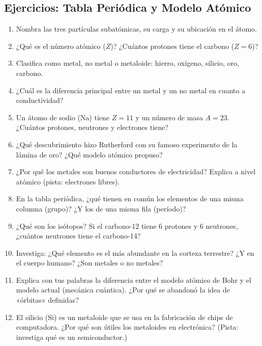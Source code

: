 \documentclass[12pt, letterpaper]{article}
\begin{document}
\newpage

\subsection{Ejercicios: Tabla Periódica y Modelo Atómico}

\begin{enumerate}[leftmargin=*, resume]
  \item \facil{} Nombra las tres partículas subatómicas, su carga y su ubicación en el átomo.

  \item \facil{} ¿Qué es el número atómico ($Z$)? ¿Cuántos protones tiene el carbono ($Z = 6$)?

  \item \facil{} Clasifica como metal, no metal o metaloide: hierro, oxígeno, silicio, oro, carbono.

  \item \facil{} ¿Cuál es la diferencia principal entre un metal y un no metal en cuanto a conductividad?

  \item \medio{} Un átomo de sodio (Na) tiene $Z = 11$ y un número de masa $A = 23$. ¿Cuántos protones, neutrones y electrones tiene?

  \item \medio{} ¿Qué descubrimiento hizo Rutherford con su famoso experimento de la lámina de oro? ¿Qué modelo atómico propuso?

  \item \medio{} ¿Por qué los metales son buenos conductores de electricidad? Explica a nivel atómico (pista: electrones libres).

  \item \medio{} En la tabla periódica, ¿qué tienen en común los elementos de una misma columna (grupo)? ¿Y los de una misma fila (período)?

  \item \dificil{} ¿Qué son los isótopos? Si el carbono-12 tiene 6 protones y 6 neutrones, ¿cuántos neutrones tiene el carbono-14?

  \item \dificil{} Investiga: ¿Qué elemento es el más abundante en la corteza terrestre? ¿Y en el cuerpo humano? ¿Son metales o no metales?

  \item \dificil{} Explica con tus palabras la diferencia entre el modelo atómico de Bohr y el modelo actual (mecánica cuántica). ¿Por qué se abandonó la idea de «órbitas» definidas?

  \item \dificil{} El silicio (Si) es un metaloide que se usa en la fabricación de chips de computadora. ¿Por qué son útiles los metaloides en electrónica? (Pista: investiga qué es un semiconductor.)
\end{enumerate}
\end{document}
